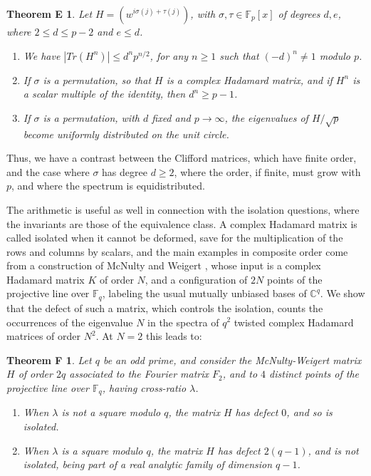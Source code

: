 \documentclass[11pt]{amsart}
\newtheorem*{theoremE}{Theorem E}
\newtheorem*{theoremF}{Theorem F}
\theoremstyle{definition}
\begin{document}
\begin{theoremE}
Let $H=(w^{i\sigma(j)+\tau(j)})$, with $\sigma,\tau\in\mathbb F_p[x]$ of degrees $d,e$, where $2\leq d\leq p-2$ and $e\leq d$.
\begin{enumerate}
\item We have $|Tr(H^n)|\leq d^np^{n/2}$, for any $n\geq1$ such that $(-d)^n\neq1$ modulo $p$.

\item If $\sigma$ is a permutation, so that $H$ is a complex Hadamard matrix, and if $H^n$ is a scalar multiple of the identity, then $d^n\geq p-1$.

\item If $\sigma$ is a permutation, with $d$ fixed and $p\to\infty$, the eigenvalues of $H/\sqrt{p}$ become uniformly distributed on the unit circle.
\end{enumerate}
\end{theoremE}

Thus, we have a contrast between the Clifford matrices, which have finite order, and the case where $\sigma$ has degree $d\geq2$, where the order, if finite, must grow with $p$, and where the spectrum is equidistributed. 

\medskip

The arithmetic is useful as well in connection with the isolation questions, where the invariants are those of the equivalence class. A complex Hadamard matrix is called isolated when it cannot be deformed, save for the multiplication of the rows and columns by scalars, and the main examples in composite order come from a construction of McNulty and Weigert \cite{mwi}, whose input is a complex Hadamard matrix $K$ of order $N$, and a configuration of $2N$ points of the projective line over $\mathbb F_q$, labeling the usual mutually unbiased bases of $\mathbb C^q$. We show that the defect of such a matrix, which controls the isolation, counts the occurrences of the eigenvalue $N$ in the spectra of $q^2$ twisted complex Hadamard matrices of order $N^2$. At $N=2$ this leads to:

\begin{theoremF}
Let $q$ be an odd prime, and consider the McNulty-Weigert matrix $H$ of order $2q$ associated to the Fourier matrix $F_2$, and to $4$ distinct points of the projective line over $\mathbb F_q$, having cross-ratio $\lambda$.
\begin{enumerate}
\item When $\lambda$ is not a square modulo $q$, the matrix $H$ has defect $0$, and so is isolated.

\item When $\lambda$ is a square modulo $q$, the matrix $H$ has defect $2(q-1)$, and is not isolated, being part of a real analytic family of dimension $q-1$.
\end{enumerate}
\end{theoremF}
\end{document}
